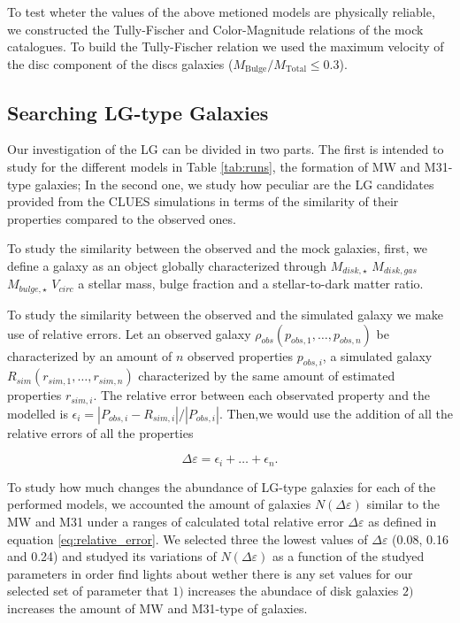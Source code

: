 \documentclass[usenatbib]{mn2e}
\begin{document}
To test wheter the values of the above metioned models are physically
reliable, we constructed the Tully-Fischer and Color-Magnitude
relations of the mock catalogues. To build the Tully-Fischer relation
we used the maximum velocity of the disc component of the discs
galaxies ($M_{\text{Bulge}}/M_{\text{Total}}\le 0.3$). 


\subsection{Searching LG-type Galaxies}
\label{sec:method:finding-lg}
Our investigation of the LG can be divided in two parts. The first is
intended to study  for the  different models in Table \ref{tab:runs},
the formation of MW  and M31-type galaxies; In the second one, we
study how peculiar are the LG candidates provided from the CLUES
simulations in terms of the similarity of their properties compared to
the observed ones. 


To study the similarity between the observed and the mock galaxies,
first, we define a galaxy as an object globally characterized through
$M_{disk,\star}$   $M_{disk,gas}$    $M_{bulge,\star}$    $V_{circ}$ a
stellar mass, bulge fraction  and a stellar-to-dark matter ratio. 

To study the similarity between the observed and the simulated galaxy
we make use of relative errors. Let an observed galaxy
$\rho_{obs}(p_{obs,1}, \dots ,p_{obs,n})$ be characterized by an
amount of $n$ observed properties $p_{obs,i}$, a simulated galaxy
$R_{sim}(r_{sim,1}, \dots,r_{sim,n})$ characterized by the same amount
of  estimated properties $r_{sim,i}$. The relative error between each
observated property and the modelled is
$\epsilon_i=|P_{obs,i}-R_{sim,i}|/|P_{obs,i}|$. Then,we would use the
addition of all the relative errors of all the properties 

\begin{equation}
 \Delta \varepsilon = \epsilon_i+\dots+\epsilon_n.\label{eq:relative_error}
\end{equation}

To study how much changes the abundance of LG-type galaxies for each
of the performed models, we accounted the amount of galaxies $N(\Delta
\varepsilon)$ similar to the MW and M31 under a ranges of calculated
total relative error  $\Delta \varepsilon$ as defined in equation
\ref{eq:relative_error}. We selected  three the lowest values of
$\Delta \varepsilon$ (0.08, 0.16 and 0.24) and studyed its variations
of $N(\Delta \varepsilon)$ as a function of the studyed parameters in
order find lights about wether there is any set values for our
selected set of parameter that $1)$ increases the abundace of disk
galaxies $2)$increases the amount of MW and M31-type of galaxies. 
 
\end{document}
